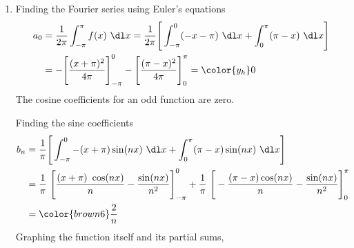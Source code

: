 \begin{enumerate}
    \item Finding the Fourier series using Euler's equations
          \begin{align}
              a_0 & = \frac{1}{2\pi} \int_{-\pi}^{\pi} f(x)\ \dl x
              = \frac{1}{2\pi} \Bigg[\int_{-\pi}^{0} (-x - \pi)\ \dl x
              +  \int_{0}^{\pi} (\pi - x)\ \dl x\Bigg]                 \\
                  & = -\Bigg[ \frac{(x + \pi)^2}{4\pi} \Bigg]_{-\pi}^0
              - \Bigg[ \frac{(\pi - x)^2}{4\pi} \Bigg]_0^{\pi}
              = \color{y_h} 0
          \end{align}
          The cosine coefficients for an odd function are zero. \par
          Finding the sine coefficients
          \begin{align}
              b_n & = \frac{1}{\pi} \Bigg[\int_{-\pi}^{0} -(x + \pi) \sin(nx)\ \dl x
              +  \int_{0}^{\pi} (\pi - x) \sin(nx)\ \dl x\Bigg]                      \\
                  & = \frac{1}{\pi}\ \Bigg[ \frac{(x + \pi)\ \cos(nx)}{n}
                  - \frac{\sin(nx)}{n^2} \Bigg]_{-\pi}^{0}
              + \frac{1}{\pi}\ \Bigg[-\frac{(\pi - x) \cos(nx)}{n}
              - \frac{\sin(nx)}{n^2} \Bigg]_{0}^{\pi}                                \\
                  & = \color{brown6} \frac{2}{n}
          \end{align}
          Graphing the function itself and its partial sums,
          \begin{figure}[H]
              \centering
\end{figure}
\end{enumerate}
